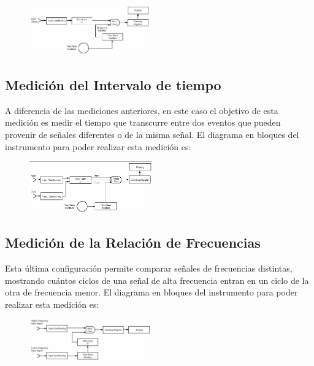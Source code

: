 \documentclass{article}
\begin{document}
		
	\begin{figure}[h]
		\centering
		\includegraphics[width=0.47\textwidth]{images/diagramaBloquesPeriodoContador.jpg}
		\medskip
	\end{figure}
	\bigskip\bigskip
	
	
\subsection{Medición del Intervalo de tiempo}
	
	A diferencia de las mediciones anteriores, en este caso el objetivo de esta medición es medir el tiempo que transcurre entre dos eventos que pueden provenir de señales diferentes o de la misma señal.
	\medskip
	El diagrama en bloques del instrumento para poder realizar esta medición es:
	
	\begin{figure}[h]
		\centering
		\includegraphics[width=0.47\textwidth]{images/diagramaBloquesIntervaloContador.jpg}
		\medskip
	\end{figure}
	\bigskip\bigskip
	
\subsection{Medición de la Relación de Frecuencias} 
	\medskip
	Esta última configuración permite comparar señales de frecuencias distintas, mostrando cuántos ciclos de una señal de alta frecuencia entran en un ciclo de la otra de frecuencia menor.
	\medskip
	El diagrama en bloques del instrumento para poder realizar esta medición es:
	
	\begin{figure}[h]
		\centering
		\includegraphics[width=0.47\textwidth]{images/diagramaBloquesRelacionContador.jpg}
		\medskip
	\end{figure}
	\bigskip\bigskip
	
\end{document}

